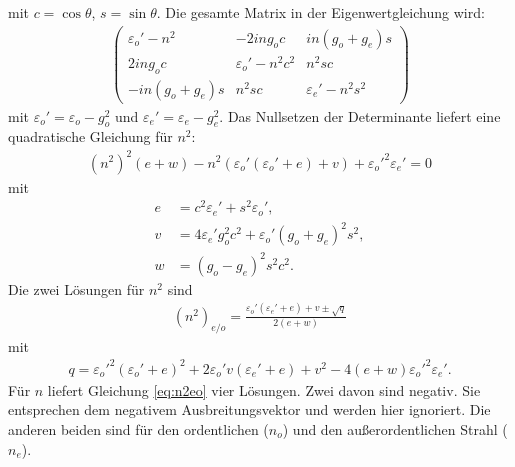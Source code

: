 \documentclass[twocolumn,10pt,DIV18]{scrartcl}
\newcommand{\eps}{\varepsilon}
\renewcommand{\[}{\left[}
\renewcommand{\]}{\right]}
\renewcommand{\(}{\left(}
\renewcommand{\)}{\right)}
\begin{document}
  mit $c=\cos\theta$, $s=\sin\theta$.  Die gesamte Matrix in der
  Eigenwertgleichung wird:
  \begin{align}
    \!\!\!\begin{pmatrix}
      \eps_o'-n^2    &  -2ing_oc           &   in(g_o+g_e)s       \\
      2ing_o c       &  \eps_o'-n^2c^2     &   n^2sc              \\
      -in(g_o+g_e)s  &  n^2sc              &   \eps_e'-n^2s^2
    \end{pmatrix}
  \end{align}
  mit $\eps_o'=\eps_o-g_o^2$ und $\eps_e'=\eps_e-g_e^2$.  Das
  Nullsetzen der Determinante liefert eine quadratische Gleichung
  f\"ur $n^2$:
  \begin{align}
    (n^2)^2(e+w)-n^2\(\eps_o'(\eps_o'+e)+v\)+\eps_o'^2\eps_e'=0
  \end{align}
  mit
  \begin{align}
    e&=c^2\eps_e'+s^2\eps_o',\\
    v&=4\eps_e'g_o^2c^2+\eps_o'(g_o+g_e)^2s^2, \\
    w&=(g_o-g_e)^2s^2c^2.
  \end{align}
  Die zwei L\"osungen f\"ur $n^2$ sind
  \begin{align}\label{eq:n2eo}
    (n^2)_{e/o}=\frac{\eps_o'(\eps_e'+e)+v
      \pm\sqrt{q}}{2(e+w)}
  \end{align}
  mit
  \begin{align}
    q=\eps_o'^2(\eps_o'+e)^2+2\eps_o'v(\eps_e'+e)+v^2-4(e+w)\eps_o'^2\eps_e'.
  \end{align}
  F\"ur $n$ liefert Gleichung \eqref{eq:n2eo} vier L\"osungen. Zwei
  davon sind negativ. Sie entsprechen dem negativem Ausbreitungsvektor
  und werden hier ignoriert. Die anderen beiden sind f\"ur den
  ordentlichen ($n_o$) und den au\ss erordentlichen Strahl ($n_e$).
\end{document}
